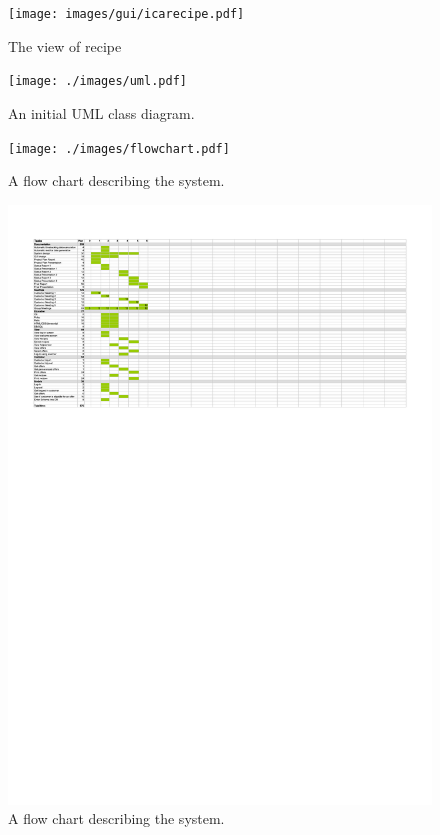 \documentclass[a4paper,twoside,titlepage]{article}
\begin{document}
            \begin{figure}[ht]
               \centering
                  \texttt{[image: images/gui/icarecipe.pdf]}
               \caption{The view of recipe}
               \label{fig:gui_recipe}
            \end{figure}

             \begin{figure}[htp]
                 \centering
                 \texttt{[image: ./images/uml.pdf]}
                 \caption{An initial UML class diagram.}
                 \label{fig:uml}
             \end{figure}

             \begin{figure}[htp]
                 \centering
                 \texttt{[image: ./images/flowchart.pdf]}
                 \caption{A flow chart describing the system.}
                 \label{fig:flowchart}
             \end{figure}

             \begin{figure}[htp]
                 \centering
                 \includegraphics[scale=2]{./images/schedule.pdf}
                 \caption{A flow chart describing the system.}
                 \label{fig:schedule}
             \end{figure}
\end{document}
